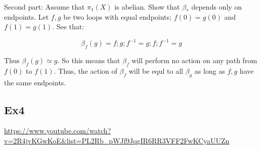 \documentclass[11pt]{book}
\begin{document}
Second part: Assume that $\pi_1(X)$ is abelian. Show that $\beta_*$ depends only on endpoints. Let $f, g$ be two
loops with equal endpoints; $f(0) = g(0)$ and $f(1) = g(1)$. See that:

$$
\beta_f(g) = f; g; f^{-1} = g; f; f^{-1} = g
$$

Thus $\beta_f(g) \simeq g$. So this means that $\beta_f$ will perform no action on any path from $f(0)$ to $f(1)$.
Thus, the action of $\beta_f$ will be equl to all $\beta_g$ as long as $f, g$ have the same endpoints.


\subsection{Ex4}
\url{https://www.youtube.com/watch?v=2R4jvKGwKoE&list=PL2Rb_pWJf9JqgIR6RR3VFF2FwKCyaUUZn}
\end{document}
